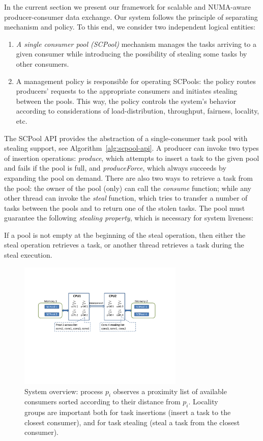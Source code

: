 In the current section we present our framework for scalable and NUMA-aware producer-consumer data exchange. 
Our system follows the principle of separating mechanism and policy.
To this end, we consider two independent logical entities: 
\begin{enumerate}
	\item \emph{A single consumer pool (SCPool)} mechanism manages the tasks arriving to a given consumer while introducing the possibility of stealing some tasks by other consumers.
	\item A management policy is responsible for operating SCPools: the policy routes producers' requests to the appropriate consumers and initiates stealing between the pools. This way, the policy controls the system's behavior according to considerations of load-distribution, throughput, fairness, locality, etc.
\end{enumerate} 



The SCPool API provides the abstraction of a single-consumer task pool with stealing support, see Algorithm~\ref{alg:scpool-api}.
A producer can invoke two types of insertion operations: \emph{produce}, which attempts to insert a task to the given pool and fails if the pool is full, and \emph{produceForce}, which always succeeds by expanding the pool on demand.
There are also two ways to retrieve a task from the pool: the owner of the pool (only) can call the \emph{consume} function; while any other thread can invoke the \emph{steal} function, which tries to transfer a number of tasks between the pools and to return one of the stolen tasks. 
The pool must guarantee the following \emph{stealing property}, which is necessary for system liveness:
\begin{property}
If a pool is not empty at the beginning of the steal operation, then either the steal operation retrieves a task, or another thread retrieves a task during the steal execution.
\end{property}


\begin{figure}[htb]
	\centering
	\includegraphics[width=0.7\textwidth]{figures/system-fig}
	\caption{\footnotesize{System overview: process $p_i$ observes a proximity list of available consumers sorted according to their distance from $p_i$. Locality groups are important both for task insertions (insert a task to the closest consumer), and for task stealing (steal a task from the closest consumer).}}
	\label{fig:system-fig}
\end{figure}


